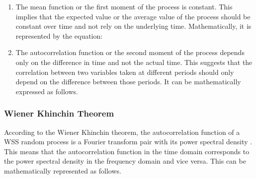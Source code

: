 \begin{enumerate}
    \item The mean function or the first moment of the process is constant. This implies that the expected value or the average value of the process should be constant over time and not rely on the underlying time. Mathematically, it is represented by the equation:

    \item The autocorrelation function or the second moment of the process depends only on the difference in time and not the actual time. This suggests that the correlation between two variables taken at different periods should only depend on the difference between those periods. It can be mathematically expressed as follows.

\end{enumerate}

\subsubsection{Wiener Khinchin Theorem}

According to the Wiener Khinchin theorem, the autocorrelation function  of a WSS random process is a Fourier transform pair with its power spectral density . This means that the autocorrelation function in the time domain corresponds to the power spectral density in the frequency domain and vice versa. This can be mathematically represented as follows.

